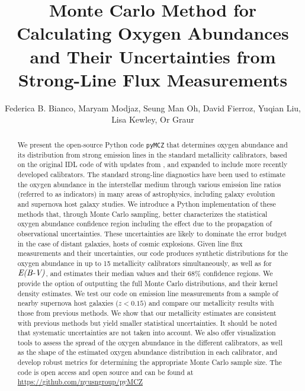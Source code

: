 \documentclass{emulateapj} \usepackage{amsmath} \usepackage{float}
\newcommand{\ebmv}{\ensuremath{\mathrm{\emph{E(B-V)}}}}
\begin{document}
\title{Monte Carlo Method for Calculating Oxygen Abundances and Their
  Uncertainties from Strong-Line Flux Measurements}

\author{Federica B. Bianco, Maryam
  Modjaz, Seung Man Oh, David
  Fierroz, Yuqian Liu, Lisa
  Kewley, Or Graur}
  
 
 
\begin{abstract}
We present the open-source Python code \verb=pyMCZ= that determines
oxygen abundance and its distribution from strong emission lines in
the standard metallicity calibrators, based on the original IDL code
of \citet{kewley02} with updates from \citet{kewley08}, and expanded
to include more recently developed calibrators.  The standard
strong-line diagnostics have been used to estimate the oxygen
abundance in the interstellar medium through various emission line
ratios (referred to as indicators) in many areas of astrophysics,
including galaxy evolution and supernova host galaxy studies.  We
introduce a Python implementation of these methods that, through Monte
Carlo sampling, better characterizes the statistical oxygen
abundance confidence region including the effect due to the
propagation of observational uncertainties.  These uncertainties are
likely to dominate the error budget in the case of distant galaxies,
hosts of cosmic explosions.  Given line flux measurements and their
uncertainties, our code produces synthetic distributions for the
oxygen abundance in up to 15 metallicity calibrators simultaneously,
as well as for \ebmv, and estimates their median values and their 68\%
confidence regions.  
We provide the option of outputting the full Monte Carlo
distributions, and their kernel density estimates.  
We test our code on emission line measurements from a sample of nearby
supernova host galaxies ($z<0.15$) and compare our metallicity results
with those from previous methods. We show that our metallicity
estimates are consistent with previous methods but yield smaller
statistical uncertainties. It should be noted that systematic
uncertainties are not taken into account.  We also offer visualization
tools to assess the spread of the oxygen abundance in the different
calibrators, as well as the shape of the estimated oxygen abundance
distribution in each calibrator, and develop robust metrics for
determining the appropriate Monte Carlo sample size.  The code is open access
and open source and can be found at
\url{https://github.com/nyusngroup/pyMCZ}
\end{abstract}
\end{document}
